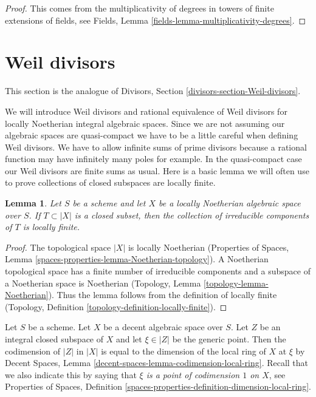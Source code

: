 \documentclass{stacks-project}
\theoremstyle{plain}
\newtheorem{lemma}[subsection]{Lemma}
\theoremstyle{definition}
\theoremstyle{remark}
\numberwithin{equation}{subsection}
\begin{document}
\begin{proof}
This comes from the multiplicativity of degrees in towers
of finite extensions of fields, see
Fields, Lemma \ref{fields-lemma-multiplicativity-degrees}.
\end{proof}










\section{Weil divisors}
\label{section-Weil-divisors}

\noindent
This section is the analogue of Divisors, Section
\ref{divisors-section-Weil-divisors}.

\medskip\noindent
We will introduce Weil divisors and rational equivalence of Weil
divisors for locally Noetherian integral algebraic spaces.
Since we are not assuming our algebraic spaces are quasi-compact we have
to be a little careful when defining Weil divisors. We have to allow
infinite sums of prime divisors because a rational function may have
infinitely many poles for example. In the quasi-compact case our
Weil divisors are finite sums as usual. Here is a basic lemma we will
often use to prove collections of closed subspaces are locally finite.

\begin{lemma}
\label{lemma-components-locally-finite}
Let $S$ be a scheme and let $X$ be a locally Noetherian
algebraic space over $S$. If $T \subset |X|$ is a closed subset,
then the collection of irreducible components of $T$ is locally finite.
\end{lemma}

\begin{proof}
The topological space $|X|$ is locally Noetherian
(Properties of Spaces, Lemma \ref{spaces-properties-lemma-Noetherian-topology}).
A Noetherian topological space has a finite number of
irreducible components and a subspace of a Noetherian space is Noetherian
(Topology, Lemma \ref{topology-lemma-Noetherian}).
Thus the lemma follows from the definition of locally finite
(Topology, Definition \ref{topology-definition-locally-finite}).
\end{proof}

\noindent
Let $S$ be a scheme. Let $X$ be a decent algebraic space over $S$.
Let $Z$ be an integral closed subspace of $X$ and let
$\xi \in |Z|$ be the generic point. Then the codimension of
$|Z|$ in $|X|$ is equal to the dimension of the local ring
of $X$ at $\xi$ by
Decent Spaces, Lemma \ref{decent-spaces-lemma-codimension-local-ring}.
Recall that we also indicate this by saying that
{\it $\xi$ is a point of codimension $1$ on $X$}, see
Properties of Spaces, Definition
\ref{spaces-properties-definition-dimension-local-ring}.
\end{document}
